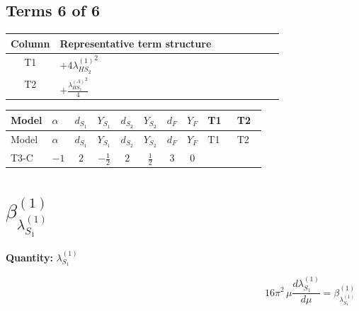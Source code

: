 \documentclass[8pt]{article}
\begin{document}
\begin{landscape}
\subsection*{Terms 6 of 6}
\begin{center}
\begin{tabular}{@{}c >{\raggedright\arraybackslash}p{0.82\linewidth}@{}}
\toprule
Column & Representative term structure \\
\midrule
T1 & \(\displaystyle +4 {\lambda_{HS_2}^{(1)}}^2\) \\
\midrule
T2 & \(\displaystyle +\frac{{\lambda_{HS_2}^{(A)}}^2}{4}\) \\
\midrule
\bottomrule
\end{tabular}
\end{center}
\smallskip
\tiny
\begin{longtable}{@{}llcccccc >{\raggedright\arraybackslash}p{0.21\linewidth} >{\raggedright\arraybackslash}p{0.21\linewidth}@{}}
\toprule
Model & $\alpha$ & $d_{S_1}$ & $Y_{S_1}$ & $d_{S_2}$ & $Y_{S_2}$ & $d_F$ & $Y_F$ & T1 & T2 \\
\midrule
\endfirsthead
\toprule
Model & $\alpha$ & $d_{S_1}$ & $Y_{S_1}$ & $d_{S_2}$ & $Y_{S_2}$ & $d_F$ & $Y_F$ & T1 & T2 \\
\midrule
\endhead
T3-C & $-1$ & $2$ & $-\frac{1}{2}$ & $2$ & $\frac{1}{2}$ & $3$ & $0$ & \scriptsize\adjustbox{max width=\linewidth}{$\begin{gathered} +4 {\lambda_{HS_2}^{(1)}}^2\end{gathered}$} & \scriptsize\adjustbox{max width=\linewidth}{$\begin{gathered} +\frac{{\lambda_{HS_2}^{(A)}}^2}{4}\end{gathered}$} \\
\midrule
\bottomrule
\end{longtable}
\clearpage
\section*{$\beta_{\lambda_{S_1}^{(1)}}^{(1)}$}
\noindent\textbf{Quantity: }$\lambda_{S_1}^{(1)}$\par\smallskip
\[16\pi^2\,\mu\frac{d \lambda_{S_1}^{(1)}}{d\mu}=\beta_{\lambda_{S_1}^{(1)}}^{(1)}\]

\end{landscape}
\end{document}
